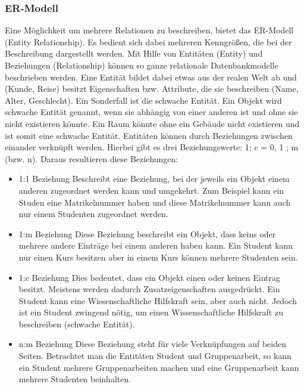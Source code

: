 \subsubsection{ER-Modell}
Eine Möglichkeit um mehrere Relationen zu beschreiben, bietet das ER-Modell (Entity Relationship). 
Es bedient sich dabei mehreren Kenngrößen, die bei der Beschreibung dargestellt werden. 
Mit Hilfe von Entitäten (Entity) und Beziehungen (Relationship) können so ganze relationale Datenbankmodelle beschrieben werden.
Eine Entität bildet dabei etwas aus der realen Welt ab und (Kunde, Reise) besitzt Eigenschaften bzw. Attribute, die sie beschreiben (Name, Alter, Geschlecht).
Ein Sonderfall ist die schwache Entität. Ein Objekt wird schwache Entität genannt, wenn sie abhängig von einer anderen ist und ohne sie nicht existieren könnte. 
Ein Raum könnte ohne ein Gebäude nicht existieren und ist somit eine schwache Entität. 
Entitäten können durch Beziehungen zwischen einander verknüpft werden. 
Hierbei gibt es drei Beziehungswerte: 1; c = {0, 1} ; m (bzw. n). 
Daraus resultieren diese Beziehungen:

\begin{itemize}
    \item 1:1 Beziehung \newline
    Beschreibt eine Beziehung, bei der jeweils ein Objekt einem anderen zugeordnet werden kann und umgekehrt. 
    Zum Beispiel kann ein Studen eine Matrikelnummer haben und diese Matrikelnummer kann auch nur einem Studenten zugeordnet werden.
    \item 1:m Beziehung \newline
    Diese Beziehung beschreibt ein Objekt, dass keins oder mehrere andere Einträge bei einem anderen haben kann. 
    Ein Student kann nur einen Kurs besitzen aber in einem Kurs können mehrere Studenten sein. 
    \item 1:c Beziehung \newline
    Dies bedeutet, dass ein Objekt einen oder keinen Eintrag besitzt. 
    Meistens werden dadurch Zusatzeigenschaften ausgedrückt. 
    Ein Student kann eine Wissenschaftliche Hilfskraft sein, aber auch nicht. 
    Jedoch ist ein Student zwingend nötig, um einen Wissenschaftliche Hilfskraft zu beschreiben (schwache Entität).
    \item n:m Beziehung \newline
    Diese Beziehung steht für viele Verknüpfungen auf beiden Seiten. 
    Betrachtet man die Entitäten Student und Gruppenarbeit, so kann ein Student mehrere Gruppenarbeiten machen und eine Gruppenarbeit kann mehrere Studenten beinhalten.
\end{itemize}

